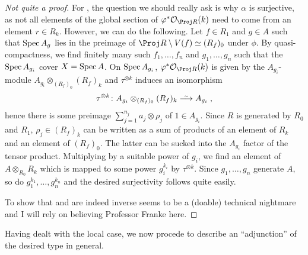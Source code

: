\documentclass[a4paper,parskip=half,numbers=enddot, DIV=12]{scrreprt}
\begin{document}
\begin{proof}[Not quite a proof]
	For , the question we should really ask is why $\alpha$ is surjective, as not all elements of the global section of $\phi^*\Oo_{\Proj R}(k)$ need to come from an element $r\in R_k$. However, we can do the following. Let $f\in R_1$ and $g\in A$ such that $\operatorname{Spec} A_g$ lies in the preimage of $\Proj R\setminus V(f)\simeq (R_f)_0$ under $\phi$. By quasi-compactness, we find finitely many such $f_1,\ldots,f_n$ and $g_1,\ldots,g_n$ such that the $\operatorname{Spec} A_{g_i}$ cover $X=\operatorname{Spec} A$. On $\operatorname{Spec} A_{g_i}$, $\phi^*\Oo_{\Proj R}(k)$ is given by the $A_{g_i}$-module $A_{g_i}\otimes_{(R_f)_0}(R_f)_k$ and $\tau^{\otimes k}$ induces an isomorphism
	\begin{align*}
		\tau^{\otimes k}\colon A_{g_i}\otimes_{(R_f)_0}(R_f)_k\isomorphism A_{g_i}\;,
	\end{align*}
	hence there is some preimage $\sum_{j=1}^{n_j}a_j\otimes \rho_j$ of $1\in A_{g_i}$. Since $R$ is generated by $R_0$ and $R_1$, $\rho_j\in (R_f)_k$ can be written as a sum of products of an element of $R_k$ and an element of $(R_f)_0$. The latter can be sucked into the $A_{g_i}$ factor of the tensor product. Multiplying by a suitable power of $g_i$, we find an element of $A\otimes_{R_0}R_k$ which is mapped to some power $g_i^{k_i}$ by $\tau^{\otimes k}$. Since $g_1,\ldots,g_n$ generate $A$, so do $g_1^{k_1},\ldots,g_n^{k_n}$ and the desired surjectivity follows quite easily.
	
	To show that  and  are indeed inverse seems to be a (doable) technical nightmare and I will rely on believing Professor Franke here.
\end{proof}
Having dealt with the local case, we now procede to describe an ``adjunction'' of the desired type in general. 
\end{document}
